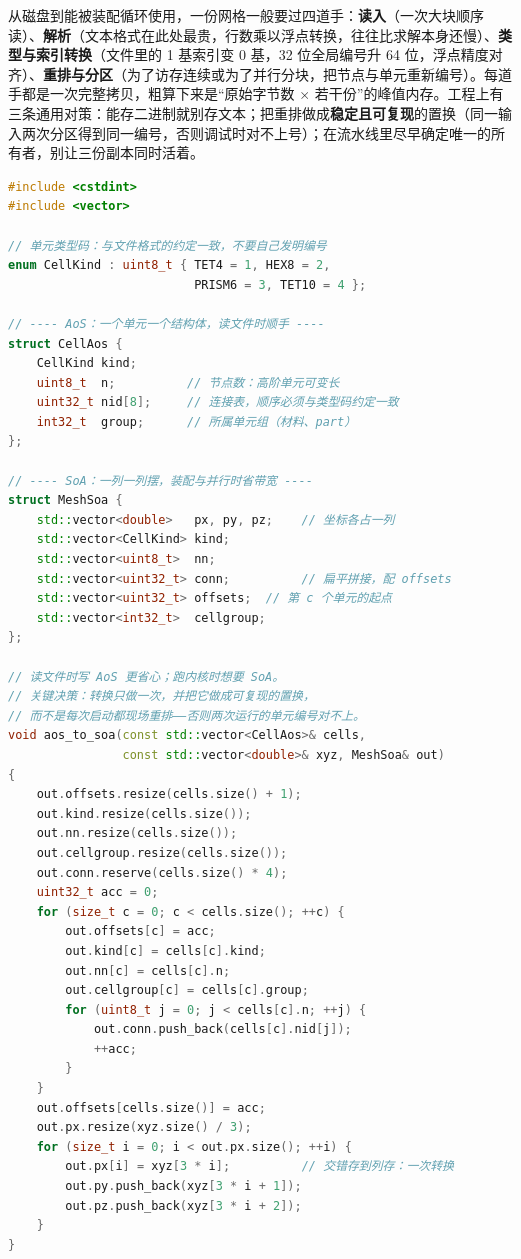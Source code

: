 \documentclass[12pt,a4paper,fontset=fandol]{ctexbook}
\begin{document}
从磁盘到能被装配循环使用，一份网格一般要过四道手：\textbf{读入}（一次大块顺序读）、\textbf{解析}（文本格式在此处最贵，行数乘以浮点转换，往往比求解本身还慢）、\textbf{类型与索引转换}（文件里的 1 基索引变 0 基，32 位全局编号升 64 位，浮点精度对齐）、\textbf{重排与分区}（为了访存连续或为了并行分块，把节点与单元重新编号）。每道手都是一次完整拷贝，粗算下来是``原始字节数 $\times$ 若干份''的峰值内存。工程上有三条通用对策：能存二进制就别存文本；把重排做成\textbf{稳定且可复现}的置换（同一输入两次分区得到同一编号，否则调试时对不上号）；在流水线里尽早确定唯一的所有者，别让三份副本同时活着。

\begin{lstlisting}[language=C++, style=cppstyle,
  caption={最小网格容器：同一份数据的 AoS 与 SoA 两种布局},
  label={lst:ch08-mesh-layout}]
#include <cstdint>
#include <vector>

// 单元类型码：与文件格式的约定一致，不要自己发明编号
enum CellKind : uint8_t { TET4 = 1, HEX8 = 2,
                          PRISM6 = 3, TET10 = 4 };

// ---- AoS：一个单元一个结构体，读文件时顺手 ----
struct CellAos {
    CellKind kind;
    uint8_t  n;          // 节点数：高阶单元可变长
    uint32_t nid[8];     // 连接表，顺序必须与类型码约定一致
    int32_t  group;      // 所属单元组（材料、part）
};

// ---- SoA：一列一列摆，装配与并行时省带宽 ----
struct MeshSoa {
    std::vector<double>   px, py, pz;    // 坐标各占一列
    std::vector<CellKind> kind;
    std::vector<uint8_t>  nn;
    std::vector<uint32_t> conn;          // 扁平拼接，配 offsets
    std::vector<uint32_t> offsets;  // 第 c 个单元的起点
    std::vector<int32_t>  cellgroup;
};

// 读文件时写 AoS 更省心；跑内核时想要 SoA。
// 关键决策：转换只做一次，并把它做成可复现的置换，
// 而不是每次启动都现场重排——否则两次运行的单元编号对不上。
void aos_to_soa(const std::vector<CellAos>& cells,
                const std::vector<double>& xyz, MeshSoa& out)
{
    out.offsets.resize(cells.size() + 1);
    out.kind.resize(cells.size());
    out.nn.resize(cells.size());
    out.cellgroup.resize(cells.size());
    out.conn.reserve(cells.size() * 4);
    uint32_t acc = 0;
    for (size_t c = 0; c < cells.size(); ++c) {
        out.offsets[c] = acc;
        out.kind[c] = cells[c].kind;
        out.nn[c] = cells[c].n;
        out.cellgroup[c] = cells[c].group;
        for (uint8_t j = 0; j < cells[c].n; ++j) {
            out.conn.push_back(cells[c].nid[j]);
            ++acc;
        }
    }
    out.offsets[cells.size()] = acc;
    out.px.resize(xyz.size() / 3);
    for (size_t i = 0; i < out.px.size(); ++i) {
        out.px[i] = xyz[3 * i];          // 交错存到列存：一次转换
        out.py.push_back(xyz[3 * i + 1]);
        out.pz.push_back(xyz[3 * i + 2]);
    }
}
\end{lstlisting}
\end{document}
